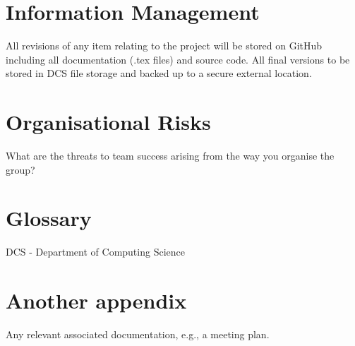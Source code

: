 \documentclass{l3deliverable}
\begin{document}

\section{Information Management}

All revisions of any item relating to the project will be stored on GitHub including all documentation (.tex files) and source code. All final versions to be stored in DCS file storage and backed up to a secure external location.


\section{Organisational Risks}

What are the threats to team success arising from the way you organise
the group?


\appendix

\section{Glossary}

DCS - Department of Computing Science

\section{Another appendix}

Any relevant associated documentation, e.g., a meeting plan.
\end{document}
